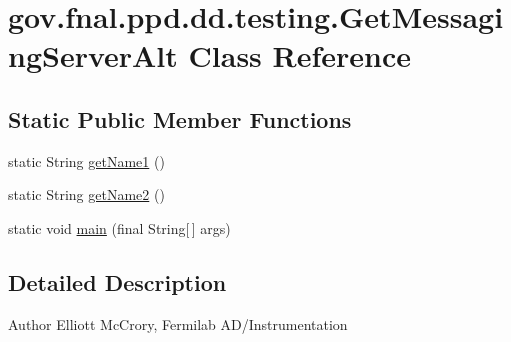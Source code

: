 \hypertarget{classgov_1_1fnal_1_1ppd_1_1dd_1_1testing_1_1GetMessagingServerAlt}{\section{gov.\-fnal.\-ppd.\-dd.\-testing.\-Get\-Messaging\-Server\-Alt Class Reference}
\label{classgov_1_1fnal_1_1ppd_1_1dd_1_1testing_1_1GetMessagingServerAlt}
}
\subsection*{Static Public Member Functions}
\begin{DoxyCompactItemize}
\item 
static String \hyperlink{classgov_1_1fnal_1_1ppd_1_1dd_1_1testing_1_1GetMessagingServerAlt_aa3728f1966c458af18e135bd9eb4cd89}{get\-Name1} ()
\item 
static String \hyperlink{classgov_1_1fnal_1_1ppd_1_1dd_1_1testing_1_1GetMessagingServerAlt_ac5d4901a63c8416962950b0295794641}{get\-Name2} ()
\item 
static void \hyperlink{classgov_1_1fnal_1_1ppd_1_1dd_1_1testing_1_1GetMessagingServerAlt_a9b3f1570ddfed2bff12102f22564061a}{main} (final String\mbox{[}$\,$\mbox{]} args)
\end{DoxyCompactItemize}


\subsection{Detailed Description}
\begin{DoxyAuthor}{Author}
Elliott Mc\-Crory, Fermilab A\-D/\-Instrumentation 
\end{DoxyAuthor}


